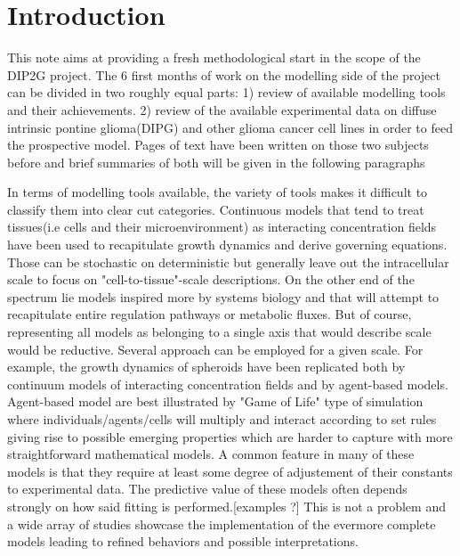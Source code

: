 \documentclass[11pt,a4paper]{article}
\begin{document}
\tableofcontents

\section{Introduction}
This note aims at providing a fresh methodological start in the scope of the DIP2G project. The 6 first months of work on the modelling side of the project can be divided in two roughly equal parts: 1) review of available modelling tools and their achievements. 2) review of the available experimental data on diffuse intrinsic pontine glioma(DIPG) and other glioma cancer cell lines in order to feed  the prospective model. Pages of text have been written on those two subjects before and brief summaries of both will be given in the following paragraphs 

In terms of modelling tools available, the variety of tools makes it difficult to classify them into clear cut categories. Continuous models that tend to treat tissues(i.e cells and their microenvironment) as interacting concentration fields have been used to recapitulate growth dynamics and derive governing equations. Those can be stochastic on deterministic but generally leave out the intracellular scale to focus on "cell-to-tissue"-scale descriptions. On the other end of the spectrum lie models inspired more by systems biology  and that will attempt to recapitulate entire regulation pathways or metabolic fluxes. But of course, representing  all models as belonging to a single axis that would describe scale would be reductive. Several approach can be employed for a given scale. For example, the growth dynamics of spheroids have been replicated both by continuum models of interacting concentration fields and by agent-based models. Agent-based model are best illustrated by "Game of Life" type of simulation where individuals/agents/cells will multiply and interact according  to set rules giving rise to possible emerging properties which are harder to capture with more straightforward mathematical models. A common feature in many of these models is that they require at least some degree of adjustement of  their constants to experimental data. The predictive value of these models often depends strongly on how said fitting is performed.[examples ?] This is not a problem and  a wide array of studies showcase the implementation of the evermore complete models leading to refined behaviors and possible interpretations.
\end{document}
